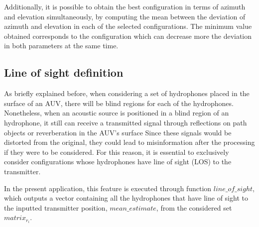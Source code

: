 Additionally, it is possible to obtain the best configuration in terms of azimuth and elevation simultaneously, by computing the mean between the deviation of azimuth and elevation in each of the selected configurations. The minimum value obtained corresponds to the configuration which can decrease more the deviation in both parameters at the same time.

\subsection{Line of sight definition} \label{subsec:lineofsight}

As briefly explained before, when considering a set of hydrophones placed in the surface of an AUV, there will be blind regions for each of the hydrophones. Nonetheless, when an acoustic source is positioned in a blind region of an hydrophone, it still can receive a transmitted signal through reflections on path objects or reverberation in the AUV's surface Since these signals would be distorted from the original, they could lead to misinformation after the processing if they were to be considered. For this reason, it is essential to exclusively consider configurations whose hydrophones have line of sight (LOS) to the transmitter. 

In the present application, this feature is executed through function $line\_of\_sight$, which outputs a vector containing all the hydrophones that have line of sight to the inputted transmitter position, $mean\_estimate$, from the considered set $matrix_{r_{i}}$. 

